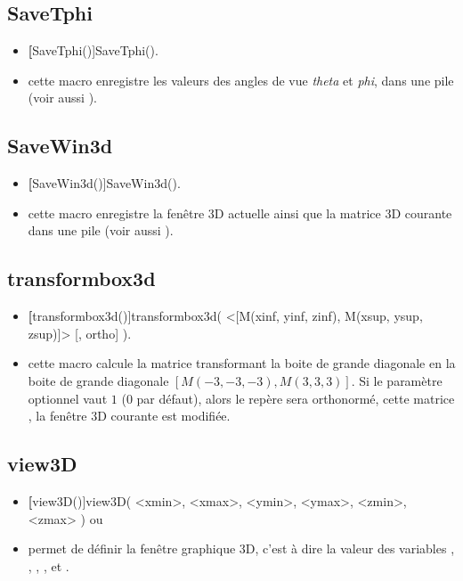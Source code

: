 \subsection{SaveTphi}\label{macSaveTphi}
\begin{itemize}
 \item \util \textbf[SaveTphi()]{SaveTphi()}.
 \item \desc cette macro enregistre les valeurs des angles de vue \textit{theta} et \textit{phi}, dans une pile (voir aussi ).
\end{itemize}

\subsection{SaveWin3d}\label{macSaveWin3d}
\begin{itemize}
 \item \util \textbf[SaveWin3d()]{SaveWin3d()}.
 \item \desc cette macro enregistre la fenêtre 3D actuelle ainsi que la matrice 3D courante dans une pile (voir aussi ).
\end{itemize}

\subsection{transformbox3d}
\begin{itemize}
 \item \util \textbf[transformbox3d()]{transformbox3d( <[M(xinf, yinf, zinf), M(xsup, ysup, zsup)]> [, ortho] )}.
 \item \desc cette macro calcule la matrice transformant la boite de grande diagonale  en la boite de grande diagonale $[M(-3,-3,-3),M(3,3,3)]$. Si le paramètre optionnel  vaut $1$ ($0$ par défaut), alors le repère sera orthonormé, cette matrice , la fenêtre 3D courante est modifiée.
\end{itemize}

\subsection{view3D}
\begin{itemize}
 \item \util \textbf[view3D()]{view3D( <xmin>, <xmax>, <ymin>, <ymax>, <zmin>, <zmax> )} ou  
 \item \desc permet de définir la fenêtre graphique 3D, c'est à dire la valeur des variables , ,
, ,  et .
\end{itemize}

